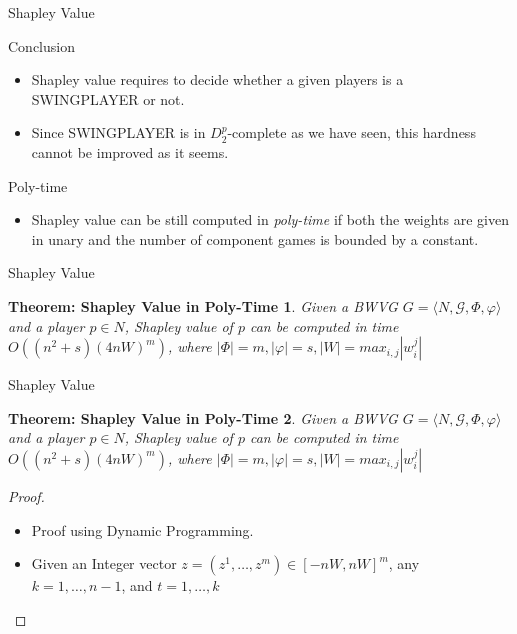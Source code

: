 \documentclass{beamer}
\begin{document}
\begin{frame}[fragile]{Shapley Value}
  \begin{block}{Conclusion}
    \begin{itemize}
      \item Shapley value requires to decide whether a given players is a SWINGPLAYER or not.
      \item Since SWINGPLAYER is in $D_2^p$-complete as we have seen, this hardness cannot be improved as it seems.
    \end{itemize}
  \end{block}
  \begin{block}{Poly-time}
    \begin{itemize}
      \item Shapley value can be still computed in \textit{poly-time} if both the weights are given in unary and the number of component games 
      is bounded by a constant.
    \end{itemize}
  \end{block}
 \end{frame}

 \begin{frame}[fragile]{Shapley Value}
  \newtheorem{theorem6}{Theorem: Shapley Value in Poly-Time}
  \begin{theorem6}
    Given a BWVG $G = \langle N, \mathcal{G}, \Phi, \varphi \rangle$ and a player $p \in N$, Shapley value of $p$ can be computed in time $O((n^2 + s)(4nW)^m)$, where $|\Phi| = m, |\varphi| = s, |W| = max_{i,j}|w_i^j|$
  \end{theorem6}
\end{frame}

\begin{frame}[fragile]{Shapley Value}
  \begin{theorem6}
    Given a BWVG $G = \langle N, \mathcal{G}, \Phi, \varphi \rangle$ and a player $p \in N$, Shapley value of $p$ can be computed in time $O((n^2 + s)(4nW)^m)$, where $|\Phi| = m, |\varphi| = s, |W| = max_{i,j}|w_i^j|$
  \end{theorem6}
  \begin{proof}
    \begin{itemize}
      \item Proof using Dynamic Programming.
      \item Given an Integer vector $z = (z^1,\dots,z^m) \in [-nW, nW]^m$, any $k=1,\dots,n-1$, and $t = 1,\dots,k$
    \end{itemize}
  \end{proof}
\end{frame}
\end{document}
